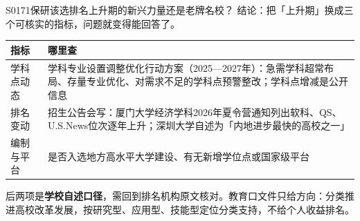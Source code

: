 \begin{qa}{S0171}{保研该选排名上升期的新兴力量还是老牌名校？}
结论：把「上升期」换成三个可核实的指标，问题就变得能回答了。

\par\vspace{2pt}\nobreak\begin{center}\footnotesize
\begin{tabularx}{\textwidth}{>{\raggedright\arraybackslash}X>{\raggedright\arraybackslash}X}
\toprule
\textbf{指标} & \textbf{哪里查} \\ \midrule
学科点动态 & 学科专业设置调整优化行动方案（2025—2027年）：急需学科超常布局、存量专业优化、对需求不足的学科点预警整改；学科点增减是公开信息 \\
排名变动 & 招生公告会写：厦门大学经济学科2026年夏令营通知列出软科、QS、U.S.News位次逐年上升；深圳大学自述为「内地进步最快的高校之一」 \\
编制与平台 & 是否入选地方高水平大学建设、有无新增学位点或国家级平台 \\
\bottomrule
\end{tabularx}
\end{center}\vspace{2pt}\par

后两项是\textbf{学校自述口径}，需回到排名机构原文核对。教育口文件只给方向：分类推进高校改革发展，按研究型、应用型、技能型定位分类支持，不给个人收益排名。
\end{qa}

